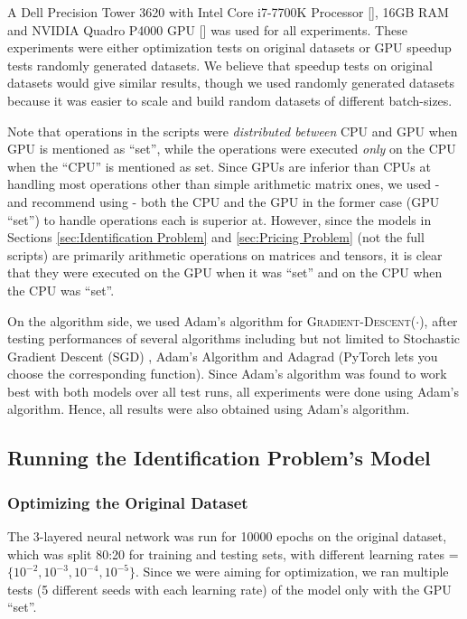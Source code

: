 \documentclass[12pt]{article}
\begin{document}
    A Dell Precision Tower 3620 with Intel Core i7-7700K Processor [], 16GB RAM and NVIDIA Quadro P4000 GPU [] was used for all experiments. These experiments were either optimization tests on original datasets or GPU speedup tests randomly generated datasets. We believe that speedup tests on original datasets would give similar results, though we used randomly generated datasets because it was easier to scale and build random datasets of different batch-sizes.
    
    Note that operations in the scripts were \textit{distributed between} CPU and GPU when GPU is mentioned as ``set'', while the operations were executed \textit{only} on the CPU when the ``CPU'' is mentioned as set. Since GPUs are inferior than CPUs at handling most operations other than simple arithmetic matrix ones, we used - and recommend using - both the CPU and the GPU in the former case (GPU ``set'') to handle operations each is superior at. However, since the models in Sections \ref{sec:Identification Problem} and \ref{sec:Pricing Problem} (not the full scripts) are primarily arithmetic operations on matrices and tensors, it is clear that they were executed on the GPU when it was ``set'' and on the CPU when the CPU was ``set''.
    
    On the algorithm side, we used Adam's algorithm for \textsc{Gradient-Descent}($\cdot$), after testing performances of several algorithms including but not limited to Stochastic Gradient Descent (SGD) \cite{SGD}, Adam's Algorithm \cite{Adam} and Adagrad \cite{Adagrad} (PyTorch lets you choose the corresponding function). Since Adam's algorithm was found to work best with both models over all test runs, all experiments were done using Adam's algorithm. Hence, all results were also obtained using Adam's algorithm.
    
    \subsection{Running the Identification Problem's Model} \label{sec:Running the Identification Problem's Model}
    \subsubsection{Optimizing the Original Dataset} \label{sec:Identification Problem-Optimizing the Original Dataset}
    The 3-layered neural network was run for 10000 epochs on the original dataset, which was split 80:20 for training and testing sets, with different learning rates = $\{10^{-2}, 10^{-3}, 10^{-4}, 10^{-5}\}$. Since we were aiming for optimization, we ran multiple tests (5 different seeds with each learning rate) of the model only with the GPU ``set''.
    
\end{document}
